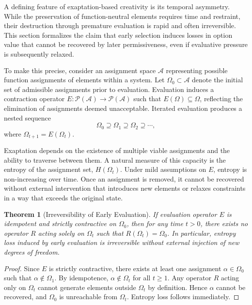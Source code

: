 \documentclass[11pt]{article}
\newtheorem{theorem}{Theorem}
\theoremstyle{definition}
\begin{document}
A defining feature of exaptation-based creativity is its temporal asymmetry. While the preservation of function-neutral elements requires time and restraint, their destruction through premature evaluation is rapid and often irreversible. This section formalizes the claim that early selection induces losses in option value that cannot be recovered by later permissiveness, even if evaluative pressure is subsequently relaxed.

To make this precise, consider an assignment space $\mathcal{A}$ representing possible function assignments of elements within a system. Let $\Omega_0 \subset \mathcal{A}$ denote the initial set of admissible assignments prior to evaluation. Evaluation induces a contraction operator $E:\mathcal{P}(\mathcal{A}) \to \mathcal{P}(\mathcal{A})$ such that $E(\Omega) \subseteq \Omega$, reflecting the elimination of assignments deemed unacceptable. Iterated evaluation produces a nested sequence
\[
\Omega_0 \supseteq \Omega_1 \supseteq \Omega_2 \supseteq \cdots,
\]
where $\Omega_{t+1} = E(\Omega_t)$.

Exaptation depends on the existence of multiple viable assignments and the ability to traverse between them. A natural measure of this capacity is the entropy of the assignment set, $H(\Omega_t)$. Under mild assumptions on $E$, entropy is non-increasing over time. Once an assignment is removed, it cannot be recovered without external intervention that introduces new elements or relaxes constraints in a way that exceeds the original state.

\begin{theorem}[Irreversibility of Early Evaluation]
If evaluation operator $E$ is idempotent and strictly contractive on $\Omega_0$, then for any time $t>0$, there exists no operator $R$ acting solely on $\Omega_t$ such that $R(\Omega_t) = \Omega_0$. In particular, entropy loss induced by early evaluation is irreversible without external injection of new degrees of freedom.
\end{theorem}

\begin{proof}
Since $E$ is strictly contractive, there exists at least one assignment $\alpha \in \Omega_0$ such that $\alpha \notin \Omega_1$. By idempotence, $\alpha \notin \Omega_t$ for all $t \geq 1$. Any operator $R$ acting only on $\Omega_t$ cannot generate elements outside $\Omega_t$ by definition. Hence $\alpha$ cannot be recovered, and $\Omega_0$ is unreachable from $\Omega_t$. Entropy loss follows immediately.
\end{proof}
\end{document}
